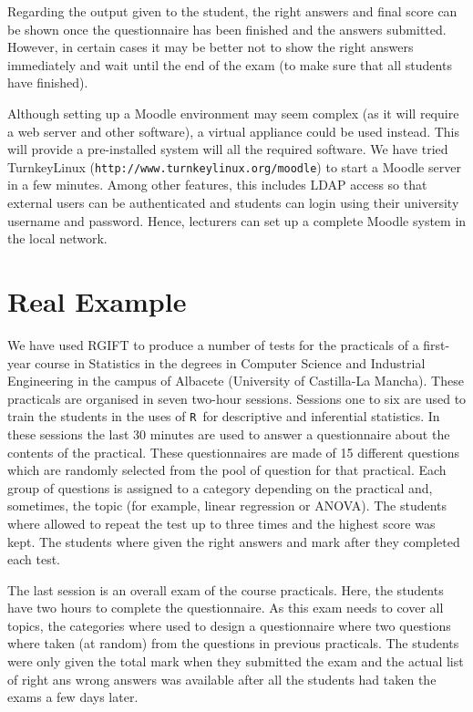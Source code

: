 \documentclass[a4paper]{article}
\newcommand{\RR}{\texttt{R}\ }
\newcommand{\pkg}[1]{\textsf{#1}}
\begin{document}
Regarding the output given to the student, the right answers and final score
can be shown once the questionnaire has been finished and the answers
submitted. However, in certain cases it may be better not to show the right
answers immediately and wait until the end of the exam (to make sure that all
students have finished).  

Although setting up a Moodle environment may seem complex (as it will require a
web server and other software), a virtual appliance could be used instead. This
will provide a pre-installed system will all the required software. We have
tried TurnkeyLinux (\verb+http://www.turnkeylinux.org/moodle+) to start a
Moodle server in a few minutes. Among other features, this includes LDAP
access so that external users can be authenticated and students can login
using their university username and password. Hence, lecturers can set up
a complete Moodle system in the local network.

\section{Real Example}


We have used \pkg{RGIFT} to produce a number of tests for the practicals of a
first-year course in Statistics in the degrees in Computer Science and
Industrial Engineering in the campus of Albacete (University of Castilla-La
Mancha). These practicals are organised in seven two-hour sessions. Sessions
one to six are used to train the students in the uses of \RR for descriptive
and inferential statistics. In these sessions the last 30 minutes are used to
answer a questionnaire about the contents of the practical. These
questionnaires are made of 15 different questions which are randomly selected
from the pool of question for that practical. Each group of questions is
assigned to a category depending on the practical and, sometimes, the topic
(for example, linear regression or ANOVA).
The students where allowed to repeat the test up to three times and the highest
score was kept. The students where given the right answers and mark
after they completed each test.

The last session is an overall exam of the course practicals. Here, the
students have two hours to complete the questionnaire. As this exam needs to
cover all topics, the categories where used to design a questionnaire where two
questions where taken (at random) from the questions in previous practicals.
The students were only given the total mark when they submitted the exam and
the actual list of right ans wrong answers was available after all the students
had taken the exams a few days later.
\end{document}
